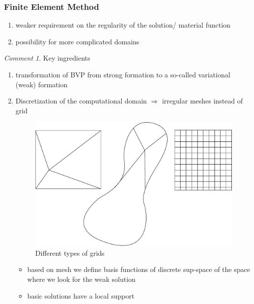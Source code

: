 \documentclass[english]{article}
\theoremstyle{definition}
\theoremstyle{remark}
\newtheorem*{comm}{Comment}
\newcommand{\drw}{\Rightarrow}			%
\begin{document}
\subsubsection{Finite Element Method}
\begin{enumerate}
\item weaker requirement on the regularity of the solution/ material function
\item possibility for more complicated domains
\end{enumerate}
\begin{comm}
  Key ingredients
  \begin{enumerate}
  \item transformation of BVP from strong formation to a so-called variational  (weak) formation
  \item Discretization of the computational domain $\drw$ irregular meshes instead of grid

    \begin{figure}[H]
      \begin{center}
        \includegraphics[width=\textwidth]{figs/differentGrids.pdf}
      \end{center}
      \caption{Different types of grids}
      \label{different-grids-figure}
    \end{figure}

    \begin{itemize}
    \item based on mesh we define basis functions of discrete sup-space of the space where we look for the weak solution
    \item basic solutions have a local support
    \end{itemize}
  \end{enumerate}
\end{comm}
\end{document}
